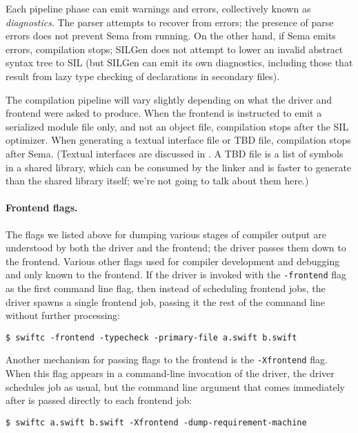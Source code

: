 \documentclass[../generics]{subfiles}
\begin{document}
Each pipeline phase can emit warnings and errors, collectively known as \emph{diagnostics}. The parser attempts to recover from errors; the presence of parse errors does not prevent Sema from running. On the other hand, if Sema emits errors, compilation stops; SILGen does not attempt to lower an invalid abstract syntax tree to SIL (but SILGen can emit its own diagnostics, including those that result from lazy type checking of declarations in secondary files).

The compilation pipeline will vary slightly depending on what the driver and frontend were asked to produce. When the frontend is instructed to emit a serialized module file only, and not an object file, compilation stops after the SIL optimizer. When generating a textual interface file or TBD file, compilation stops after Sema. (Textual interfaces are discussed in . A TBD file is a list of symbols in a shared library, which can be consumed by the linker and is faster to generate than the shared library itself; we're not going to talk about them here.)

\paragraph{Frontend flags.}
The flags we listed above for dumping various stages of compiler output are understood by both the driver and the frontend; the driver passes them down to the frontend. Various other flags used for compiler development and debugging and only known to the frontend. If the driver is invoked with the \texttt{-frontend} flag as the first command line flag, then instead of scheduling frontend jobs, the driver spawns a single frontend job, passing it the rest of the command line without further processing:
\begin{Verbatim}
$ swiftc -frontend -typecheck -primary-file a.swift b.swift
\end{Verbatim}
Another mechanism for passing flags to the frontend is the \texttt{-Xfrontend} flag. When this flag appears in a command-line invocation of the driver, the driver schedules job as usual, but the command line argument that comes immediately after is passed directly to each frontend job:
\begin{Verbatim}
$ swiftc a.swift b.swift -Xfrontend -dump-requirement-machine
\end{Verbatim}
\end{document}
